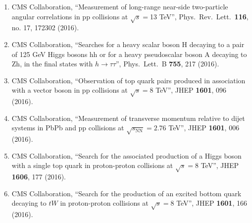 \begin{itemize}
\begin{enumerate}
\item CMS Collaboration, ``Measurement of long-range near-side two-particle angular correlations in pp collisions at $\sqrt s =$13 TeV'', Phys.\ Rev.\ Lett.\  {\bf 116}, no. 17, 172302 (2016).

\item CMS Collaboration, ``Searches for a heavy scalar boson H decaying to a pair of 125 GeV Higgs bosons hh or for a heavy pseudoscalar boson A decaying to Zh, in the final states with $h \to \tau \tau$'', Phys.\ Lett.\ B {\bf 755}, 217 (2016).

\item CMS Collaboration, ``Observation of top quark pairs produced in association with a vector boson in pp collisions at $ \sqrt{s}=8 $ TeV'', JHEP {\bf 1601}, 096 (2016).

\item CMS Collaboration, ``Measurement of transverse momentum relative to dijet systems in PbPb and pp collisions at $ \sqrt{s_{\mathrm{NN}}}=2.76 $ TeV'', JHEP {\bf 1601}, 006 (2016).

\item CMS Collaboration, ``Search for the associated production of a Higgs boson with a single top quark in proton-proton collisions at $ \sqrt{s}=8 $ TeV'', JHEP {\bf 1606}, 177 (2016).

\item CMS Collaboration, ``Search for the production of an excited bottom quark decaying to $tW$ in proton-proton collisions at $ \sqrt{s}=8 $ TeV'', JHEP {\bf 1601}, 166 (2016).


\end{enumerate}
\end{itemize}
